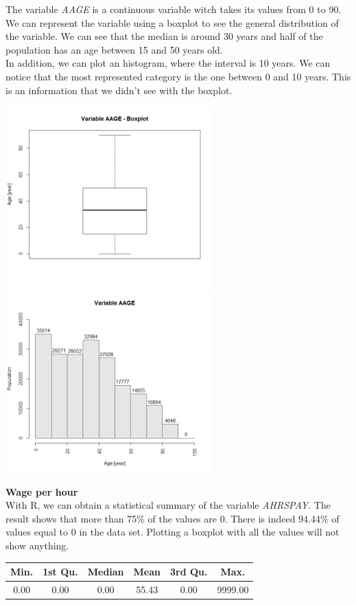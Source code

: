 \documentclass{article}
\begin{document}
\noindent The variable \textit{AAGE} is a continuous variable witch takes its values from $0$ to $90$. We can represent the variable using a boxplot to see the general distribution of the variable. We can see that the median is around 30 years and half of the population has an age between 15 and 50 years old.\\In addition, we can plot an histogram, where the interval is 10 years. We can notice that the most represented category is the one between 0 and 10 years. This is an information that we didn't see with the boxplot.\\
\begin{center}
\includegraphics[width = 8cm]{AAGE_boxplot.png}
\includegraphics[width = 8cm]{AAGE_hist.png}
\end{center}

\noindent\textbf{Wage per hour}\\

\noindent With R, we can obtain a statistical summary of the variable \textit{AHRSPAY}. The result shows that more than 75\% of the values are 0. There is indeed 94.44\% of values equal to 0 in the data set. Plotting a boxplot with all the values will not show anything.\\
\begin{center}
\begin{tabular}{c|c|c|c|c|c}
Min. & 1st Qu. &  Median & Mean & 3rd Qu. & Max. \\
\hline
0.00 & 0.00 & 0.00 & 55.43 & 0.00 & 9999.00 \\
\end{tabular}
\end{center}
\end{document}
